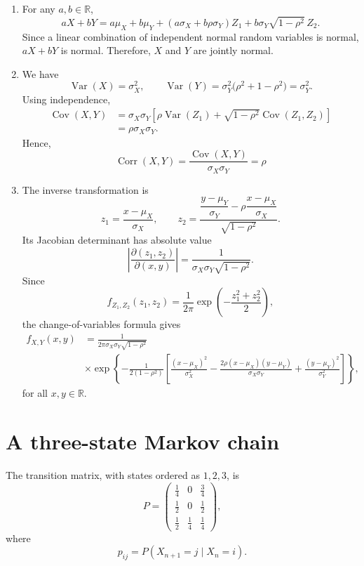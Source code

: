 \documentclass[11pt,a4paper]{article}
\begin{document}
\begin{enumerate}
\item[(a)] For any \(a,b\in\mathbb{R}\),
\[
aX+bY
=a\mu_X+b\mu_Y
+(a\sigma_X+b\rho\sigma_Y)Z_1
+b\sigma_Y\sqrt{1-\rho^2}\,Z_2.
\]
Since a linear combination of independent normal random variables
is normal, \(aX+bY\) is normal. Therefore, \(X\) and \(Y\) are
jointly normal.

\item[(b)] We have
\[
\operatorname{Var}(X)=\sigma_X^2,
\qquad
\operatorname{Var}(Y)
=\sigma_Y^2\bigl(\rho^2+1-\rho^2\bigr)
=\sigma_Y^2.
\]
Using independence,
\[
\begin{aligned}
\operatorname{Cov}(X,Y)
&=\sigma_X\sigma_Y
\left[
\rho\operatorname{Var}(Z_1)
+\sqrt{1-\rho^2}\operatorname{Cov}(Z_1,Z_2)
\right]\\
&=\rho\sigma_X\sigma_Y.
\end{aligned}
\]
Hence,
\[
\operatorname{Corr}(X,Y)
=\frac{\operatorname{Cov}(X,Y)}{\sigma_X\sigma_Y}
=\rho
\]

\item[(c)] The inverse transformation is
\[
z_1=\frac{x-\mu_X}{\sigma_X},
\qquad
z_2=
\frac{\dfrac{y-\mu_Y}{\sigma_Y}
-\rho\dfrac{x-\mu_X}{\sigma_X}}
{\sqrt{1-\rho^2}}.
\]
Its Jacobian determinant has absolute value
\[
\left|\frac{\partial(z_1,z_2)}{\partial(x,y)}\right|
=\frac{1}{\sigma_X\sigma_Y\sqrt{1-\rho^2}}.
\]
Since
\[
f_{Z_1,Z_2}(z_1,z_2)
=\frac{1}{2\pi}
\exp\left(-\frac{z_1^2+z_2^2}{2}\right),
\]
the change-of-variables formula gives
\[
\begin{aligned}
f_{X,Y}(x,y)
&=\frac{1}{2\pi\sigma_X\sigma_Y\sqrt{1-\rho^2}}\\
&\times\exp\left\{
-\frac{1}{2(1-\rho^2)}
\left[
\frac{(x-\mu_X)^2}{\sigma_X^2}
-\frac{2\rho(x-\mu_X)(y-\mu_Y)}{\sigma_X\sigma_Y}
+\frac{(y-\mu_Y)^2}{\sigma_Y^2}
\right]
\right\},
\end{aligned}
\]
for all \(x,y\in\mathbb{R}\).
\end{enumerate}

\section{A three-state Markov chain}
The transition matrix, with states ordered as \(1,2,3\), is
\[
P=
\begin{pmatrix}
\frac14&0&\frac34\\[2pt]
\frac12&0&\frac12\\[2pt]
\frac12&\frac14&\frac14
\end{pmatrix},
\]
where
\[
p_{ij}=P(X_{n+1}=j\mid X_n=i).
\]
\end{document}
